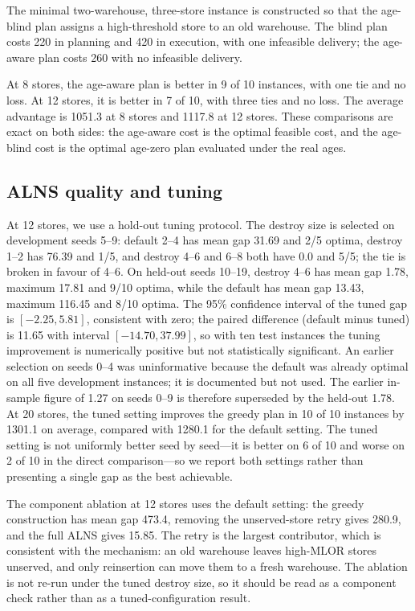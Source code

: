 \documentclass[preprint,12pt]{elsarticle}
\begin{document}
The minimal two-warehouse, three-store instance is constructed so that the age-blind plan assigns a high-threshold store to an old warehouse. The blind plan costs 220 in planning and 420 in execution, with one infeasible delivery; the age-aware plan costs 260 with no infeasible delivery.

At 8 stores, the age-aware plan is better in 9 of 10 instances, with one tie and no loss. At 12 stores, it is better in 7 of 10, with three ties and no loss. The average advantage is 1051.3 at 8 stores and 1117.8 at 12 stores. These comparisons are exact on both sides: the age-aware cost is the optimal feasible cost, and the age-blind cost is the optimal age-zero plan evaluated under the real ages.

\subsection{ALNS quality and tuning}

At 12 stores, we use a hold-out tuning protocol. The destroy size is selected on development seeds 5--9: default 2--4 has mean gap 31.69 and 2/5 optima, destroy 1--2 has 76.39 and 1/5, and destroy 4--6 and 6--8 both have 0.0 and 5/5; the tie is broken in favour of 4--6. On held-out seeds 10--19, destroy 4--6 has mean gap 1.78, maximum 17.81 and 9/10 optima, while the default has mean gap 13.43, maximum 116.45 and 8/10 optima. The 95\% confidence interval of the tuned gap is $[-2.25,5.81]$, consistent with zero; the paired difference (default minus tuned) is 11.65 with interval $[-14.70,37.99]$, so with ten test instances the tuning improvement is numerically positive but not statistically significant. An earlier selection on seeds 0--4 was uninformative because the default was already optimal on all five development instances; it is documented but not used. The earlier in-sample figure of 1.27 on seeds 0--9 is therefore superseded by the held-out 1.78. At 20 stores, the tuned setting improves the greedy plan in 10 of 10 instances by 1301.1 on average, compared with 1280.1 for the default setting. The tuned setting is not uniformly better seed by seed---it is better on 6 of 10 and worse on 2 of 10 in the direct comparison---so we report both settings rather than presenting a single gap as the best achievable.

The component ablation at 12 stores uses the default setting: the greedy construction has mean gap 473.4, removing the unserved-store retry gives 280.9, and the full ALNS gives 15.85. The retry is the largest contributor, which is consistent with the mechanism: an old warehouse leaves high-MLOR stores unserved, and only reinsertion can move them to a fresh warehouse. The ablation is not re-run under the tuned destroy size, so it should be read as a component check rather than as a tuned-configuration result.
\end{document}
